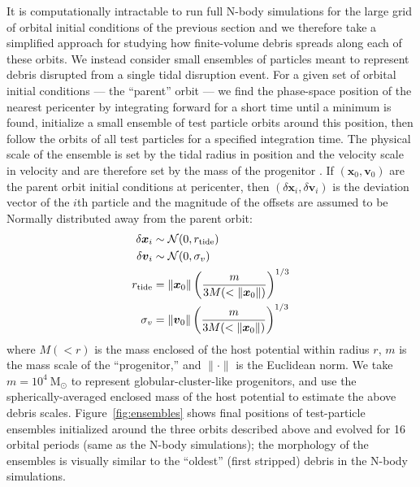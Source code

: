 \documentclass[letterpaper,12pt,preprint]{aastex}
\newcommand{\msun}{\ensuremath{\mathrm{M}_\odot}}
\newcommand{\bs}[1]{\boldsymbol{#1}}
\begin{document}
It is computationally intractable to run full N-body simulations for the large grid of orbital initial conditions of the previous section and we therefore take a simplified approach for studying how finite-volume debris spreads along each of these orbits. We instead consider small ensembles of particles meant to represent debris disrupted from a single tidal disruption event. For a given set of orbital initial conditions --- the ``parent'' orbit --- we find the phase-space position of the nearest pericenter by integrating forward for a short time until a minimum is found, initialize a small ensemble of test particle orbits around this position, then follow the orbits of all test particles for a specified integration time. The physical scale of the ensemble is set by the tidal radius in position and the velocity scale in velocity and are therefore set by the mass of the progenitor \citep[e.g.,][]{johnston98, apw14}. If $(\bs{x}_0,\bs{v}_0)$ are the parent orbit initial conditions at pericenter, then $(\delta\bs{x}_i,\delta\bs{v}_i)$ is the deviation vector of the $i$th particle and the magnitude of the offsets are assumed to be Normally distributed away from the parent orbit:
\begin{align}
	\delta\bs{x}_i &\sim \mathcal{N}(0, r_{\rm tide})\\
	\delta\bs{v}_i &\sim \mathcal{N}(0, \sigma_v)\\
	r_{\rm tide} &= \|\bs{x}_0\| \left(\frac{m}{3M(<\|\bs{x}_0\|)}\right)^{1/3} \\
	\sigma_v &= \|\bs{v}_0\|\left(\frac{m}{3M(<\|\bs{x}_0\|)}\right)^{1/3} 
\end{align}
where $M(<r)$ is the mass enclosed of the host potential within radius $r$, $m$ is the mass scale of the ``progenitor,'' and $\|\cdot \|$ is the Euclidean norm. We take $m=10^4~\msun$ to represent globular-cluster-like progenitors, and use the spherically-averaged enclosed mass of the host potential to estimate the above debris scales. Figure~\ref{fig:ensembles} shows final positions of test-particle ensembles initialized around the three orbits described above and evolved for 16 orbital periods (same as the N-body simulations); the morphology of the ensembles is visually similar to the ``oldest'' (first stripped) debris in the N-body simulations.
\end{document}
